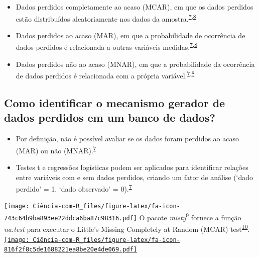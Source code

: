 \documentclass[
]{book}
\begin{document}
\begin{itemize}
\item
  Dados perdidos completamente ao acaso (MCAR), em que os dados perdidos estão distribuídos aleatoriamente nos dados da amostra.\textsuperscript{\protect\hyperlink{ref-Heymans2022}{7},\protect\hyperlink{ref-carpenter2021}{8}}
\item
  Dados perdidos ao acaso (MAR), em que a probabilidade de ocorrência de dados perdidos é relacionada a outras variáveis medidas.\textsuperscript{\protect\hyperlink{ref-Heymans2022}{7},\protect\hyperlink{ref-carpenter2021}{8}}
\item
  Dados perdidos não ao acaso (MNAR), em que a probabilidade da ocorrência de dados perdidos é relacionada com a própria variável.\textsuperscript{\protect\hyperlink{ref-Heymans2022}{7},\protect\hyperlink{ref-carpenter2021}{8}}
\end{itemize}

\hypertarget{como-identificar-o-mecanismo-gerador-de-dados-perdidos-em-um-banco-de-dados}{%
\subsection{Como identificar o mecanismo gerador de dados perdidos em um banco de dados?}\label{como-identificar-o-mecanismo-gerador-de-dados-perdidos-em-um-banco-de-dados}}

\begin{itemize}
\item
  Por definição, não é possível avaliar se os dados foram perdidos ao acaso (MAR) ou não (MNAR).\textsuperscript{\protect\hyperlink{ref-Heymans2022}{7}}
\item
  Testes t e regressões logísticas podem ser aplicados para identificar relações entre variáveis com e sem dados perdidos, criando um fator de análise (`dado perdido' = 1, `dado observado' = 0).\textsuperscript{\protect\hyperlink{ref-Heymans2022}{7}}
\end{itemize}

\texttt{[image: Ciência-com-R\_files/figure-latex/fa-icon-743c64b9ba893ee22ddca6ba87c98316.pdf]} O pacote \emph{misty}\textsuperscript{\protect\hyperlink{ref-misty}{9}} fornece a função \emph{na.test} para executar o Little's Missing Completely at Random (MCAR) test\textsuperscript{\protect\hyperlink{ref-little1988}{10}}. \href{https://cran.r-project.org/web/packages/misty/index.html}{\texttt{[image: Ciência-com-R\_files/figure-latex/fa-icon-816f2f8c5de1688221ea8be20e4de069.pdf]}}
\end{document}
